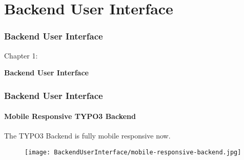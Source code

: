 %

\section{Backend User Interface}
\begin{frame}[fragile]
	\frametitle{Backend User Interface}

	\begin{center}\huge{Chapter 1:}\end{center}
	\begin{center}\huge{\color{typo3darkgrey}\textbf{Backend User Interface}}\end{center}

\end{frame}


\begin{frame}[fragile]
	\frametitle{Backend User Interface}
	\framesubtitle{Mobile Responsive TYPO3 Backend}

	The TYPO3 Backend is fully mobile responsive now.

	\begin{figure}
		\texttt{[image: BackendUserInterface/mobile-responsive-backend.jpg]}
	\end{figure}

\end{frame}



